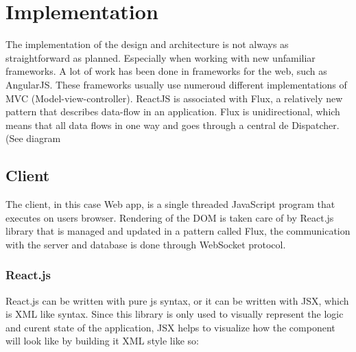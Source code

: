 \chapter{Implementation}
The implementation of the design and architecture is not always as straightforward as planned. Especially when working with new unfamiliar frameworks. A lot of work has been done in frameworks for the web, such as AngularJS. These frameworks usually use numeroud different implementations of MVC (Model-view-controller). ReactJS is associated with Flux, a relatively new pattern that describes data-flow in an application. Flux is unidirectional, which means that all data flows in one way and goes through a central de Dispatcher. (See diagram 
\section{Client}
The client, in this case Web app, is a single threaded JavaScript program that executes on users browser. Rendering of the DOM is taken care of by React.js library that is managed and updated in a pattern called Flux, the communication with the server and database is done through WebSocket protocol.
\subsection{React.js}
React.js can be written with pure js syntax, or it can be written with JSX, which is XML like syntax. Since this library is only used to visually represent the logic and curent state of the application, JSX helps to visualize how the component will look like by building it XML style like so:



